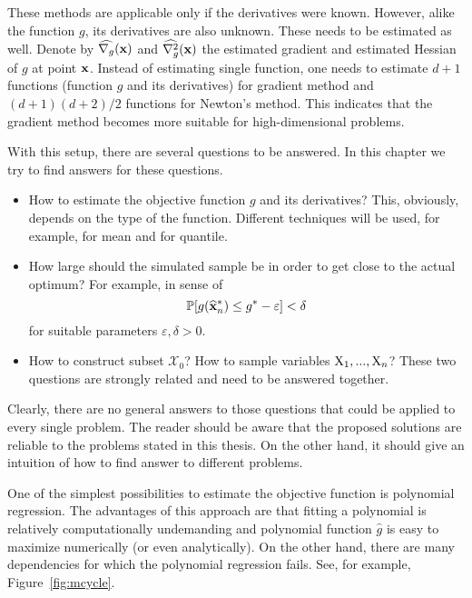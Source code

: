 These methods are applicable only if the derivatives were known. However, alike the function $g$, its derivatives are also unknown. These needs to be estimated as well. Denote by $\widehat{\nabla_g} (\mathbf{x})$ and $\widehat{\nabla_g^2} (\mathbf{x})$ the estimated gradient and estimated Hessian of $g$ at point $\mathbf{x}$. Instead of estimating single function, one needs to estimate $d+1$ functions (function $g$ and its derivatives) for gradient method and $(d+1)(d+2)/2$ functions for Newton's method. This indicates that the gradient method becomes more suitable for high-dimensional problems.

With this setup, there are several questions to be answered. In this chapter we try to find answers for these questions.
\begin{itemize}
	
	\item
	How to estimate the objective function $g$ and its derivatives? This, obviously, depends on the type of the function. Different techniques will be used, for example, for mean and for quantile.
	
	\item
	How large should the simulated sample be in order to get close to the actual optimum? For example, in sense of
	\[
		\operatorname{\mathbb{P}} [ g (\widehat{\mathbf{x}}^{*}_n ) \leq g^{*} - \varepsilon ] < \delta
	\]
	for suitable parameters $\varepsilon, \delta > 0$.
	
	\item
	How to construct subset $\mathcal{X}_0$? How to sample variables $\operatorname{\bm{X}}_1, ..., \operatorname{\bm{X}}_n$? These two questions are strongly related and need to be answered together.
	
\end{itemize}

Clearly, there are no general answers to those questions that could be applied to every single problem. The reader should be aware that the proposed solutions are reliable to the problems stated in this thesis. On the other hand, it should give an intuition of how to find answer to different problems.

One of the simplest possibilities to estimate the objective function is polynomial regression. The advantages of this approach are that fitting a polynomial is relatively computationally undemanding and polynomial function $\widehat{g}$ is easy to maximize numerically (or even analytically). On the other hand, there are many dependencies for which the polynomial regression fails. See, for example, Figure~\ref{fig:mcycle}.

